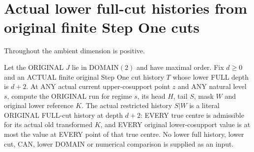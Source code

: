 \section{Actual lower full-cut histories from original finite Step One cuts}

Throughout the ambient dimension is positive.
\begin{theorem}
\label{hir:original-finite-stepone-cut-lower-full-history}
\leanok
Let the ORIGINAL $J$ lie in DOMAIN$(2)$ and have maximal order. Fix
$d\ge0$ and an ACTUAL finite original Step One cut history $T$ whose
lower FULL depth is $d+2$. At ANY actual current upper-cosupport point $z$
and ANY natural level $s$, compute the ORIGINAL run for regime $s$, its
head $H$, tail $S$, mask $W$ and original lower reference $K$. The actual
restricted history $S|W$ is a literal ORIGINAL FULL-cut history at depth
$d+2$: EVERY true centre is admissible for its actual old transformed $K$,
and EVERY original lower-cosupport value is at most the value at EVERY
point of that true centre. No lower full history, lower cut, CAN, lower DOMAIN
or numerical comparison is supplied as an input.
\end{theorem}
